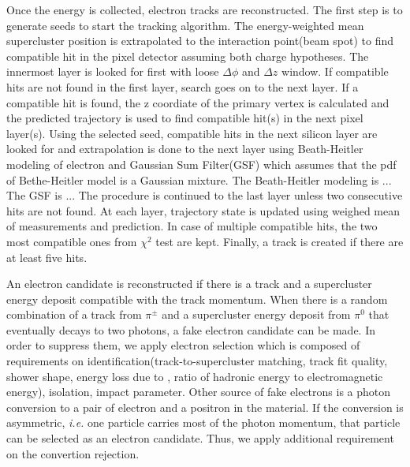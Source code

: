 Once the energy is collected, electron tracks are reconstructed. The first step is 
to generate seeds to start the tracking algorithm. The energy-weighted mean 
supercluster position is extrapolated to the interaction point(beam spot) 
to find compatible hit in the pixel detector assuming both charge hypotheses. 
The innermost layer is looked for first with loose $\Delta\phi$ and $\Delta z$ window. 
If compatible hits are not found in the first layer, search goes on to the next layer. 
If a compatible hit is found, the z coordiate of the primary vertex is calculated 
and the predicted trajectory is used to find compatible hit(s) in the next pixel layer(s).  
Using the selected seed, compatible hits in the next silicon layer are looked for  
and extrapolation is done to the next layer using Beath-Heitler modeling of electron \brem{} \cite{} 
and Gaussian Sum Filter(GSF) \cite{0954-3899-31-9-N01} which assumes that the pdf of 
Bethe-Heitler model is a Gaussian mixture. 
The Beath-Heitler modeling is ...  
The GSF is ... 
The procedure is continued to the last layer unless two consecutive hits are not found. 
At each layer, trajectory state is updated using weighed mean of measurements 
and prediction. In case of multiple compatible hits, the two most compatible ones 
from $\chi^2$ test are kept. Finally, a track is created if there are at least five hits. 



An electron candidate is reconstructed if there is a track and a supercluster energy deposit
compatible with the track momentum. When there is a random combination of 
a track from $\pi^\pm$ and a supercluster energy deposit from $\pi^0$ that eventually 
decays to two photons, a fake electron candidate can be made. 
In order to suppress them, we apply electron selection which is composed of 
requirements on identification(track-to-supercluster matching, 
track fit quality, shower shape, energy loss due to \brem{}, ratio of hadronic energy
to electromagnetic energy), isolation, impact parameter.  
Other source of fake electrons is a photon conversion to a pair of electron and a positron 
in the material. If the conversion is asymmetric, \textit{i.e.} one particle carries 
most of the photon momentum, that particle can be selected as an electron 
candidate. Thus, we apply additional requirement on the convertion rejection.

